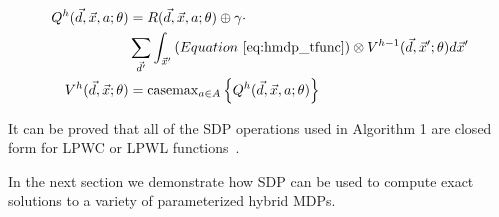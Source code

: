 {\footnotesize 
    \abovedisplayskip=0pt
    \belowdisplayskip=0pt
    \begin{align}
        Q^{h}(\vec{d}, \vec{x}, a; \theta) &= R(\vec{d}, \vec{x}, a; \theta) \oplus \gamma \cdot  \nonumber \\ 
        & \sum_{\vec{d}'} \int_{\vec{x}'} \left( Equation~\eqref{eq:hmdp_tfunc} \right) \otimes V^{h-1}(\vec{d}, \vec{x}'; \theta) d\vec{x}' \label{eq:vi_qfunc} \\
        V^{h}(\vec{d}, \vec{x}; \theta) &= \mathrm{casemax}_{a \in A} \left\{ Q^{h}(\vec{d}, \vec{x}, a; \theta) \right\} \label{eq:vi_vfunc}
    \end{align}
}%

It can be proved that all of the SDP operations used in Algorithm 1 are closed form for LPWC or LPWL functions~\parencite{Sanner_UAI_2011,Zamani_AAAI_2012}.

In the next section we demonstrate how SDP can be used to compute exact solutions to a variety of parameterized hybrid MDPs.
